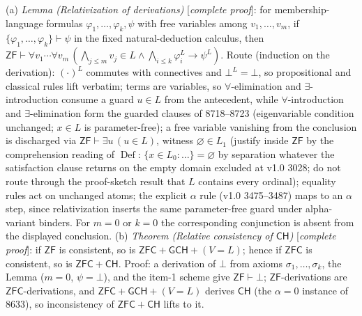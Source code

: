 (a) \emph{Lemma (Relativization of derivations)} [\emph{complete proof}]: for membership-language formulas \(\varphi_1,\dots,\varphi_k,\psi\) with free variables among \(v_1,\dots,v_m\), if \(\{\varphi_1,\dots,\varphi_k\}\vdash\psi\) in the fixed natural-deduction calculus, then \(\mathsf{ZF}\vdash\forall v_1\cdots\forall v_m\,(\bigwedge_{j\le m} v_j\in L\wedge\bigwedge_{i\le k}\varphi_i^{L}\to\psi^{L})\).
Route (induction on the derivation): \((\cdot)^{L}\) commutes with connectives and \(\bot^{L}=\bot\), so propositional and classical rules lift verbatim; terms are variables, so \(\forall\)-elimination and \(\exists\)-introduction consume a guard \(u\in L\) from the antecedent, while \(\forall\)-introduction and \(\exists\)-elimination form the guarded clauses of 8718--8723 (eigenvariable condition unchanged; \(x\in L\) is parameter-free); a free variable vanishing from the conclusion is discharged via \(\mathsf{ZF}\vdash\exists u\,(u\in L)\), witness \(\varnothing\in L_1\) (justify inside \(\mathsf{ZF}\) by the comprehension reading of \(\operatorname{Def}\): \(\{x\in L_0:\ldots\}=\varnothing\) by separation whatever the satisfaction clause returns on the empty domain excluded at v1.0 3028; do not route through the proof-sketch result that \(L\) contains every ordinal); equality rules act on unchanged atoms; the explicit \(\alpha\) rule (v1.0 3475--3487) maps to an \(\alpha\) step, since relativization inserts the same parameter-free guard under alpha-variant binders.  For \(m=0\) or \(k=0\) the corresponding conjunction is absent from the displayed conclusion.
(b) \emph{Theorem (Relative consistency of \(\mathsf{CH}\))} [\emph{complete proof}]: if \(\mathsf{ZF}\) is consistent, so is \(\mathsf{ZFC}+\mathsf{GCH}+(V{=}L)\); hence if \(\mathsf{ZFC}\) is consistent, so is \(\mathsf{ZFC}+\mathsf{CH}\).  Proof: a derivation of \(\bot\) from axioms \(\sigma_1,\dots,\sigma_k\), the Lemma (\(m=0\), \(\psi=\bot\)), and the item-1 scheme give \(\mathsf{ZF}\vdash\bot\); \(\mathsf{ZF}\)-derivations are \(\mathsf{ZFC}\)-derivations, and \(\mathsf{ZFC}+\mathsf{GCH}+(V{=}L)\) derives \(\mathsf{CH}\) (the \(\alpha=0\) instance of 8633), so inconsistency of \(\mathsf{ZFC}+\mathsf{CH}\) lifts to it.

